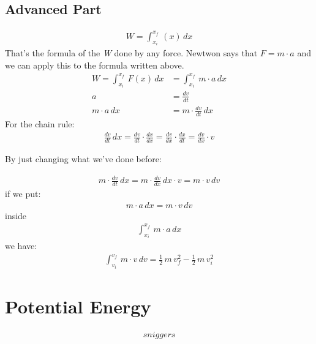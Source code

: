\documentclass{article}
\begin{document}
\subsection{Advanced Part}
\begin{align*}
\textit{W} = \int_{x_i}^{x_f}  \,(x)\, dx    
\end{align*}
That's the formula of the \textit{W} done by any force.
Newtwon says that \(\textit{F} = \textit{m} \cdot \textit{a}\) and we can apply this to the formula written above.
\begin{align*}
\textit{W} = \int_{x_i}^{x_f}  \,F(x) \, dx &= \int_{x_i}^{x_f} \,\textit{m} \cdot \textit{a} \, dx
\\ 
\textit{a} &= \frac{dv}{dt}
\\
\textit{m} \cdot \textit{a} \, dx &= \textit{m} \cdot \frac{dv}{dt} \, dx    
\end{align*}
For the chain rule:
\begin{align*}
    \frac{dv}{dt} \, dx = \frac{dv}{dt} \cdot \frac{dx}{dx} = \frac{dv}{dx} \cdot \frac{dx}{dt} = \frac{dv}{dx} \cdot \textit{v}
\end{align*}
\begin{center}
By just changing what we've done before:
\end{center}
\begin{align*}
    \textit{m} \cdot \frac{dv}{dt} \, dx = \textit{m} \cdot \frac{dv}{dx} \, dx \cdot \textit{v} = \textit{m} \cdot \textit{v} \, dv
\end{align*}
if we put:
\begin{align*}
    \textit{m} \cdot \textit{a} \, dx = \textit{m} \cdot \textit{v} \, dv   
\end{align*}
inside
\begin{align*}
    \int_{x_i}^{x_f} \,\textit{m} \cdot \textit{a} \, dx   
\end{align*}
we have:
\begin{align*}
    \int_{v_i}^{v_f} \,\textit{m} \cdot \textit{v} \, dv = \frac{1}{2} \, \textit{m} \, v_f^2 - \frac{1}{2} \, \textit{m} \, v_i^2     
\end{align*}

\section{Potential Energy}
\begin{align*}
sniggers
\end{align*}
\end{document}
